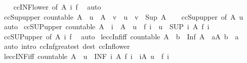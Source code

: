 \begin{isabellebody}
%
\isadelimproof
\ \ %
\endisadelimproof
%
\isatagproof
{}\isamarkupfalse%
\ ccINF{\isacharunderscore}lower\ {\isacharbrackleft}of\ A\ i\ f{\isacharbrackright}\ \isamarkupfalse%
\ auto%
\endisatagproof
{\isafoldproof}%
%
\isadelimproof
\isanewline
%
\endisadelimproof
\isanewline
{}\isamarkupfalse%
\ ccSup{\isacharunderscore}upper{}{\isacharcolon}\ {\isachardoublequoteopen}countable\ A\ {\isasymLongrightarrow}\ u\ {\isasymin}\ A\ {\isasymLongrightarrow}\ v\ {\isasymle}\ u\ {\isasymLongrightarrow}\ v\ {\isasymle}\ Sup\ A{\isachardoublequoteclose}\isanewline
%
\isadelimproof
\ \ %
\endisadelimproof
%
\isatagproof
{}\isamarkupfalse%
\ ccSup{\isacharunderscore}upper\ {\isacharbrackleft}of\ A\ u{\isacharbrackright}\ \isamarkupfalse%
\ auto%
\endisatagproof
{\isafoldproof}%
%
\isadelimproof
\isanewline
%
\endisadelimproof
\isanewline
{}\isamarkupfalse%
\ ccSUP{\isacharunderscore}upper{}{\isacharcolon}\ {\isachardoublequoteopen}countable\ A\ {\isasymLongrightarrow}\ i\ {\isasymin}\ A\ {\isasymLongrightarrow}\ u\ {\isasymle}\ f\ i\ {\isasymLongrightarrow}\ u\ {\isasymle}\ {\isacharparenleft}SUP\ i\ {\isacharcolon}A{\isachardot}\ f\ i{\isacharparenright}{\isachardoublequoteclose}\isanewline
%
\isadelimproof
\ \ %
\endisadelimproof
%
\isatagproof
{}\isamarkupfalse%
\ ccSUP{\isacharunderscore}upper\ {\isacharbrackleft}of\ A\ i\ f{\isacharbrackright}\ \isamarkupfalse%
\ auto%
\endisatagproof
{\isafoldproof}%
%
\isadelimproof
\isanewline
%
\endisadelimproof
\isanewline
{}\isamarkupfalse%
\ le{\isacharunderscore}ccInf{\isacharunderscore}iff{\isacharcolon}\ {\isachardoublequoteopen}countable\ A\ {\isasymLongrightarrow}\ b\ {\isasymle}\ Inf\ A\ {\isasymlongleftrightarrow}\ {\isacharparenleft}{\isasymforall}a{\isasymin}A{\isachardot}\ b\ {\isasymle}\ a{\isacharparenright}{\isachardoublequoteclose}\isanewline
%
\isadelimproof
\ \ %
\endisadelimproof
%
\isatagproof
{}\isamarkupfalse%
\ {\isacharparenleft}auto\ intro{\isacharcolon}\ ccInf{\isacharunderscore}greatest\ dest{\isacharcolon}\ ccInf{\isacharunderscore}lower{\isacharparenright}%
\endisatagproof
{\isafoldproof}%
%
\isadelimproof
\isanewline
%
\endisadelimproof
\isanewline
{}\isamarkupfalse%
\ le{\isacharunderscore}ccINF{\isacharunderscore}iff{\isacharcolon}\ {\isachardoublequoteopen}countable\ A\ {\isasymLongrightarrow}\ u\ {\isasymle}\ {\isacharparenleft}INF\ i\ {\isacharcolon}A{\isachardot}\ f\ i{\isacharparenright}\ {\isasymlongleftrightarrow}\ {\isacharparenleft}{\isasymforall}i{\isasymin}A{\isachardot}\ u\ {\isasymle}\ f\ i{\isacharparenright}{\isachardoublequoteclose}\isanewline

\end{isabellebody}
